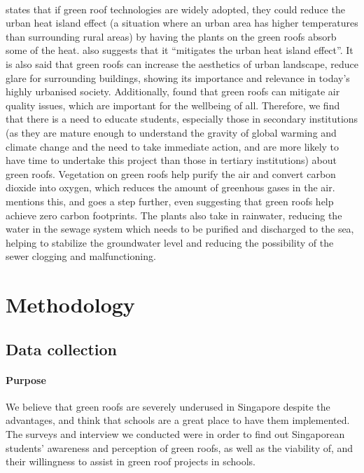 \documentclass{article}
\begin{document}
\begin{multicols}{2}
  \paragraph{}
   states that if green roof technologies are
  widely adopted, they could reduce the urban heat island effect
  (a situation where an urban area has higher temperatures
  than surrounding rural areas) by having the plants on the
  green roofs absorb some of the heat. 
  also suggests that it “mitigates the urban heat island
  effect”. It is also said that green roofs can increase the
  aesthetics of urban landscape, reduce glare for surrounding
  buildings, showing its importance and relevance in today's
  highly urbanised society. Additionally, 
  found that green roofs can mitigate air quality issues, which
  are important for the wellbeing of all. Therefore, we find
  that there is a need to educate students, especially those in
  secondary institutions (as they are mature enough to understand
  the gravity of global warming and climate change and the need
  to take immediate action, and are more likely to have time to
  undertake this project than those in tertiary institutions)
  about green roofs.  Vegetation on green roofs help purify the
  air and convert carbon dioxide into oxygen, which reduces
  the amount of greenhous gases in the air. \cite{energeff}
  mentions this, and  goes a step further,
  even suggesting that green roofs help achieve zero carbon
  footprints. The plants also take in rainwater, reducing the
  water in the sewage system which needs to be purified and
  discharged to the sea, helping to stabilize the groundwater
  level and reducing the possibility of the sewer clogging and
  malfunctioning.



  \section{Methodology}
  \subsection{Data collection}
  \paragraph{Purpose} We believe that green roofs are severely underused
  in Singapore despite the advantages, and think that schools are a
  great place to have them implemented. The surveys and interview we
  conducted were in order to find out Singaporean students’ awareness
  and perception of green roofs, as well as the viability of, and their
  willingness to assist in green roof projects in schools.


\end{multicols}
\end{document}
